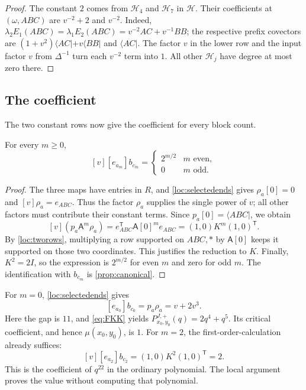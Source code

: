 \documentclass[a4paper,11pt]{amsart}
\newcommand{\qpar}{q}
\newcommand{\tpar}{v}
\numberwithin{equation}{subsection}
\theoremstyle{plain}
\theoremstyle{definition}
\theoremstyle{remark}
\begin{document}
\begin{proof}
The constant $2$ comes from $\mathcal H_4$ and $\mathcal H_7$ in $\mathcal H$. Their coefficients at $(\omega,ABC)$ are
$\tpar^{-2}+2$ and $\tpar^{-2}$. Indeed,
$\lambda_2E_1(ABC)=\lambda_1E_2(ABC)=\tpar^{-2}AC+\tpar^{-1} BB$; the respective
prefix covectors are $(1+\tpar^2)\langle AC|+\tpar\langle BB|$ and
$\langle AC|$. The factor $\tpar$ in the lower row and the input factor $\tpar$ from
$\Delta^{-1}$ turn each $\tpar^{-2}$ term into $1$.
All other $\mathcal H_j$ have degree at most zero there.
\end{proof}

\subsection{The coefficient}

The two constant rows now give the coefficient for every block count.

\begin{lemma}\label{loc:coefficient}
For every $m\ge0$,
\[
[\tpar][e_{a_m}]b_{c_m}=
\begin{cases}2^{m/2}&m\text{ even},\\0&m\text{ odd}.\end{cases}
\]
\end{lemma}

\begin{proof}
The three maps have entries in $R$, and \autoref{loc:selectedends}
gives $\rho_a[0]=0$ and $[\tpar]\rho_a=e_{ABC}$. Thus the factor $\rho_a$ supplies
the single power of $\tpar$; all other factors must contribute their
constant terms. Since $p_a[0]=\langle ABC|$, we obtain
\[
[\tpar](p_a \mathsf A^m \rho_a)=e_{ABC}^{\mathsf T}\mathsf A[0]^m e_{ABC}
=(1,0)K^m(1,0)^{\mathsf T}.
\]
By \autoref{loc:tworows}, multiplying a row supported on $ABC,*$
by $\mathsf A[0]$ keeps it supported on those two coordinates. This
justifies the reduction to $K$. Finally, $K^2=2I$, so the expression
is $2^{m/2}$ for even $m$ and zero for odd $m$.
The identification with $b_{c_m}$ is \autoref{prop:canonical}.
\end{proof}

\begin{example}\label{loc:smallreadout}
For $m=0$, \autoref{loc:selectedends} gives
\[
[e_{a_0}]b_{c_0}=p_a\rho_a=\tpar+2\tpar^3.
\]
Here the gap is $11$, and \autoref{eq:FKK} yields
$P^{J,+}_{x_0,y_0}(\qpar)=2\qpar^4+\qpar^5$.
Its critical coefficient, and hence $\mu(x_0,y_0)$, is $1$.
For $m=2$, the first-order-calculation already suffices:
\[
[\tpar][e_{a_2}]b_{c_2}=(1,0)K^2(1,0)^{\mathsf T}=2.
\]
This is the coefficient of $\qpar^{22}$ in the ordinary polynomial.
The local argument proves the value without computing that polynomial.
\end{example}
\end{document}
